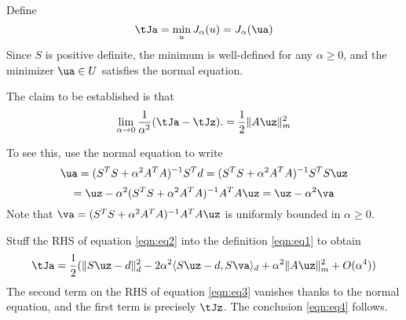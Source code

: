 Define
\begin{equation}
  \label{eqn:eq0}
  \tJa = \min_u J_{\alpha}(u) = J_{\alpha}(\ua)
\end{equation}
Since $S$ is positive definite, the minimum is well-defined for any $\alpha \ge 0$, and the minimizer $\ua \in U$ satisfies the normal equation.

The claim to be established is that
\begin{equation}
  \label{eqn:eq4}
  \lim_{\alpha \rightarrow 0} \frac{1}{\alpha^2}  (\tJa-\tJz).= \frac{1}{2}\|A\uz\|_m^2
\end{equation}

To see this, use the normal equation to write
\[
  \ua = (S^TS + \alpha^2 A^TA)^{-1}S^Td = (S^TS + \alpha^2 A^TA)^{-1}S^TS \uz
\]
\begin{equation}
  \label{eqn:eq2}
  = \uz - \alpha^2 (S^TS + \alpha^2 A^TA)^{-1}A^TA\uz = \uz-\alpha^2 \va
\end{equation}
Note that $\va = (S^TS + \alpha^2 A^TA)^{-1}A^TA\uz$ is uniformly bounded in $\alpha \ge 0$.

Stuff the RHS of equation \ref{eqn:eq2} into the definition \ref{eqn:eq1} to obtain
\begin{equation}
  \label{eqn:eq3}
  \tJa = \frac{1}{2}(\|S\uz-d\|_d^2 - 2 \alpha^2\langle S\uz-d, S\va\rangle_d + \alpha^2\|A\uz\|_m^2 + O(\alpha^4))
\end{equation}
The second term on the RHS of equation \ref{eqn:eq3} vanishes thanks to the normal equation, and the first term is precisely $\tJz$. The conclusion \ref{eqn:eq4} follows.




